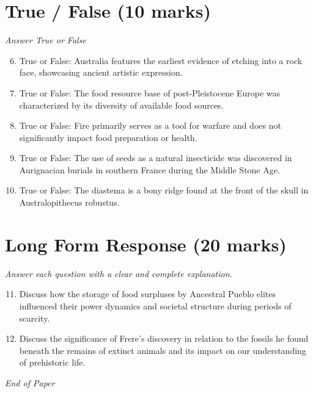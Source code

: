 \documentclass[12pt]{article}
\begin{document}
\section*{True / False (10 marks)}
\textit{Answer True or False}
\begin{enumerate}[label=\arabic*.]
\setcounter{enumi}{5}
\item True or False: Australia features the earliest evidence of etching into a rock face, showcasing ancient artistic expression.
\item True or False: The food resource base of post-Pleistocene Europe was characterized by its diversity of available food sources.
\item True or False: Fire primarily serves as a tool for warfare and does not significantly impact food preparation or health.
\item True or False: The use of seeds as a natural insecticide was discovered in Aurignacian burials in southern France during the Middle Stone Age.
\item True or False: The diastema is a bony ridge found at the front of the skull in Australopithecus robustus.
\end{enumerate}

\section*{Long Form Response (20 marks)}
\textit{Answer each question with a clear and complete explanation.}
\begin{enumerate}[label=\arabic*.]
\setcounter{enumi}{10}
\item Discuss how the storage of food surpluses by Ancestral Pueblo elites influenced their
power dynamics and societal structure during periods of scarcity.
\item Discuss the significance of Frere's discovery in relation to the fossils he found beneath
the remains of extinct animals and its impact on our understanding of prehistoric life.
\end{enumerate}

\vfill
\noindent\textit{End of Paper}
\end{document}
